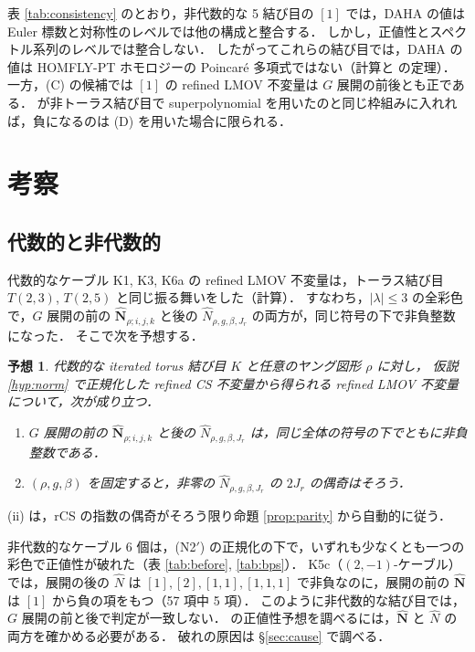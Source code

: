\documentclass[11pt,a4paper]{ltjsarticle}
\newtheorem{conjecture}[proposition]{予想}
\theoremstyle{definition}
\theoremstyle{remark}
\newcommand{\hN}{\widehat{N}}
\newcommand{\hbN}{\widehat{\mathbf{N}}}
\begin{document}
表 \ref{tab:consistency} のとおり，非代数的な 5 結び目の $[1]$ では，DAHA の値は Euler 標数と対称性のレベルでは他の構成と整合する．
しかし，正値性とスペクトル系列のレベルでは整合しない．
したがってこれらの結び目では，DAHA の値は HOMFLY-PT ホモロジーの Poincaré 多項式ではない（計算と \cite{Ras} の定理）．
一方，(C) の候補では $[1]$ の refined LMOV 不変量は $G$ 展開の前後とも正である．
\cite{KN} が非トーラス結び目で superpolynomial を用いたのと同じ枠組みに入れれば，負になるのは (D) を用いた場合に限られる．

\section{考察}\label{sec:discussion}

\subsection{代数的と非代数的}

代数的なケーブル K1, K3, K6a の refined LMOV 不変量は，トーラス結び目 $T(2,3)$, $T(2,5)$ と同じ振る舞いをした（計算）．
すなわち，$|\lambda|\le3$ の全彩色で，$G$ 展開の前の $\hbN_{\rho;i,j,k}$ と後の $\hN_{\rho,g,\beta,J_r}$ の両方が，同じ符号の下で非負整数になった．
そこで次を予想する．

\begin{conjecture}
代数的な iterated torus 結び目 $K$ と任意のヤング図形 $\rho$ に対し，
仮説 \ref{hyp:norm} で正規化した refined CS 不変量から得られる refined LMOV 不変量について，次が成り立つ．
\begin{enumerate}
\item[(i)] $G$ 展開の前の $\hbN_{\rho;i,j,k}$ と後の $\hN_{\rho,g,\beta,J_r}$ は，同じ全体の符号の下でともに非負整数である．
\item[(ii)] $(\rho,g,\beta)$ を固定すると，非零の $\hN_{\rho,g,\beta,J_r}$ の $2J_r$ の偶奇はそろう．
\end{enumerate}
\end{conjecture}
(ii) は，rCS の指数の偶奇がそろう限り命題 \ref{prop:parity} から自動的に従う．

非代数的なケーブル 6 個は，(N2$'$) の正規化の下で，いずれも少なくとも一つの彩色で正値性が破れた（表 \ref{tab:before}, \ref{tab:bps}）．
K5c（$(2,-1)$-ケーブル）では，展開の後の $\hN$ は $[1],[2],[1,1],[1,1,1]$ で非負なのに，展開の前の $\hbN$ は $[1]$ から負の項をもつ（57 項中 5 項）．
このように非代数的な結び目では，$G$ 展開の前と後で判定が一致しない．
\cite{KN} の正値性予想を調べるには，$\hbN$ と $\hN$ の両方を確かめる必要がある．
破れの原因は \S\ref{sec:cause} で調べる．
\end{document}
